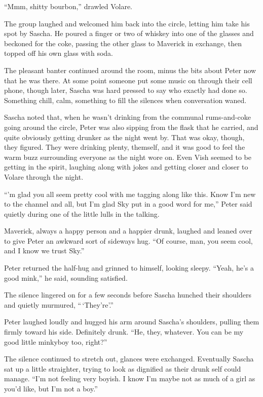 ``Mmm, shitty bourbon,'' drawled Volare.

The group laughed and welcomed him back into the circle, letting him take his spot by Sascha. He poured a finger or two of whiskey into one of the glasses and beckoned for the coke, passing the other glass to Maverick in exchange, then topped off his own glass with soda.

The pleasant banter continued around the room, minus the bits about Peter now that he was there. At some point someone put some music on through their cell phone, though later, Sascha was hard pressed to say who exactly had done so. Something chill, calm, something to fill the silences when conversation waned.

Sascha noted that, when he wasn't drinking from the communal rums-and-coke going around the circle, Peter was also sipping from the flask that he carried, and quite obviously getting drunker as the night went by. That was okay, though, they figured. They were drinking plenty, themself, and it was good to feel the warm buzz surrounding everyone as the night wore on. Even Vish seemed to be getting in the spirit, laughing along with jokes and getting closer and closer to Volare through the night.

``'m glad you all seem pretty cool with me tagging along like this. Know I'm new to the channel and all, but I'm glad Sky put in a good word for me,'' Peter said quietly during one of the little lulls in the talking.

Maverick, always a happy person and a happier drunk, laughed and leaned over to give Peter an awkward sort of sideways hug. ``Of course, man, you seem cool, and I know we trust Sky.''

Peter returned the half-hug and grinned to himself, looking sleepy. ``Yeah, he's a good mink,'' he said, sounding satisfied.

The silence lingered on for a few seconds before Sascha hunched their shoulders and quietly murmured, ``\,`They're'.''

Peter laughed loudly and hugged his arm around Sascha's shoulders, pulling them firmly toward his side. Definitely drunk. ``He, they, whatever. You can be my good little minkyboy too, right?''

The silence continued to stretch out, glances were exchanged. Eventually Sascha sat up a little straighter, trying to look as dignified as their drunk self could manage. ``I'm not feeling very boyish. I know I'm maybe not as much of a girl as you'd like, but I'm not a boy.''

